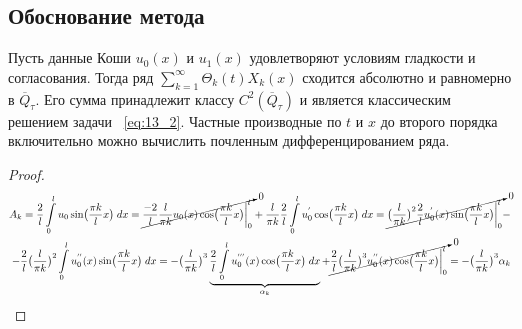 \subsection{Обоснование метода}
\begin{theorem}
Пусть данные Коши $u_0(x)$ и $u_1(x)$ удовлетворяют условиям гладкости и согласования. Тогда ряд $\sum\limits_{k = 1}^{\infty}\Theta_k(t)X_k(x)$ сходится абсолютно и равномерно в $\overline{Q}_{\tau}$. Его сумма принадлежит классу $C^2(\overline{Q}_{\tau})$ и является классическим решением задачи ~\ref{eq:13_2}. Частные производные по $t$ и $x$ до второго порядка 
включительно можно вычислить почленным дифференцированием ряда.
\end{theorem} 
\begin{proof}
\begin{align*}
	A_k = \dfrac{2}{l}\int\limits_{0}^{l}u_0\sin \bigl(\dfrac{\pi k}{l}x\bigr)\;dx = \cancelto{0}{\dfrac{-2}{l}\dfrac{l}{\pi k}u_0(x)\cos \bigl(\dfrac{\pi k}{l}x\bigr)\biggr|_0^l} + \dfrac{l}{\pi k}\dfrac{2}{l}\int\limits_0^l u_0^{'}\cos \bigl(\dfrac{\pi k}{l}x\bigr)\;dx = \cancelto{0}{\bigl(\dfrac{l}{\pi k}\bigr)^2 \dfrac{2}{l}u_0^{'}(x)\sin \bigl(\dfrac{\pi k}{l}x\bigr)\biggr|_0^l} - \\ - \dfrac{2}{l}\bigl(\dfrac{l}{\pi k}\bigr)^2 \int\limits_0^l u_0^{''}(x)\sin \bigl(\dfrac{\pi k}{l} x\bigr)\;dx = - \bigl(\dfrac{l}{\pi k}\bigr)^3 \underbrace{\dfrac{2}{l} \int\limits_0^l u_0^{'''}(x)\cos \bigl(\dfrac{\pi k}{l}x\bigr)\;dx}_{\alpha_k} + \cancelto{0}{\dfrac{2}{l}\bigl(\dfrac{l}{\pi k}\bigr)^3u_0^{''}(x)\cos \bigl(\dfrac{\pi k}{l}x\bigr)\biggr|_0^l} = - \bigl(\dfrac{l}{\pi k}\bigr)^3 \alpha_k
\end{align*}


\end{proof}
